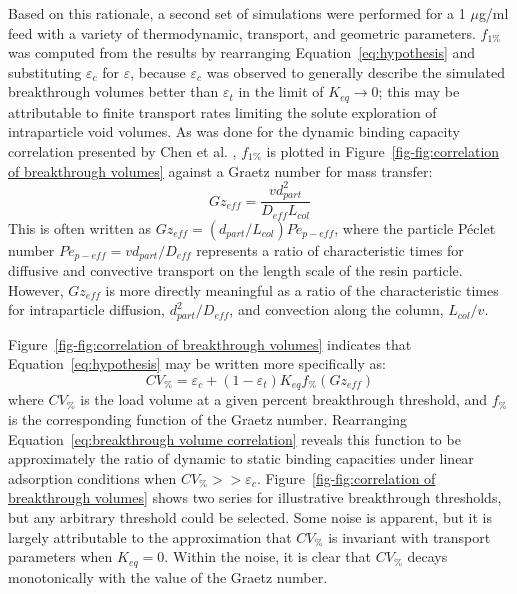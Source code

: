 \documentclass[preprint,review,12pt]{elsarticle}
\begin{document}
        
        Based on this rationale, a second set of simulations were performed for a 1 $\mu$g/ml feed with a variety of thermodynamic, transport, and geometric parameters. $f_{1\%}$ was computed from the results by rearranging Equation~\ref{eq:hypothesis} and substituting $\varepsilon_c$ for $\varepsilon$, because $\varepsilon_c$ was observed to generally describe the simulated breakthrough volumes better than $\varepsilon_t$ in the limit of $K_{eq} \to 0$; this may be attributable to finite transport rates limiting the solute exploration of intraparticle void volumes. As was done for the dynamic binding capacity correlation presented by Chen et al. \cite{Chen2020}, $f_{1\%}$ is plotted in Figure~\ref{fig-fig:correlation of breakthrough volumes} against a Graetz number for mass transfer:
        \begin{equation} \label{eq:dimensionless group}
            Gz_{eff} = \frac{v d_{part}^2}{D_{eff} L_{col}}
        \end{equation}
        This is often written as $Gz_{eff} = \left( d_{part}/L_{col} \right) P\acute{e}_{p - eff}$, where the particle P\'eclet number $P\acute{e}_{p - eff} = v d_{part}/D_{eff}$ represents a ratio of characteristic times for diffusive and convective transport on the length scale of the resin particle. However, $Gz_{eff}$ is more directly meaningful as a ratio of the characteristic times for intraparticle diffusion, $d_{part}^2/D_{eff}$, and convection along the column, $L_{col}/v$.


        Figure~\ref{fig-fig:correlation of breakthrough volumes} indicates that Equation~\ref{eq:hypothesis} may be written more specifically as:
        \begin{equation} \label{eq:breakthrough volume correlation}
            CV_\% = \varepsilon_c + (1 - \varepsilon_t) K_{eq} f_\% \left( Gz_{eff} \right)
        \end{equation}
        where $CV_\%$ is the load volume at a given percent breakthrough threshold, and $f_\%$ is the corresponding function of the Graetz number. Rearranging Equation~\ref{eq:breakthrough volume correlation} reveals this function to be approximately the ratio of dynamic to static binding capacities under linear adsorption conditions when $CV_\% >> \varepsilon_c$. Figure~\ref{fig-fig:correlation of breakthrough volumes} shows two series for illustrative breakthrough thresholds, but any arbitrary threshold could be selected. Some noise is apparent, but it is largely attributable to the approximation that $CV_\%$ is invariant with transport parameters when $K_{eq} = 0$. Within the noise, it is clear that $CV_\%$ decays monotonically with the value of the Graetz number.
\end{document}
